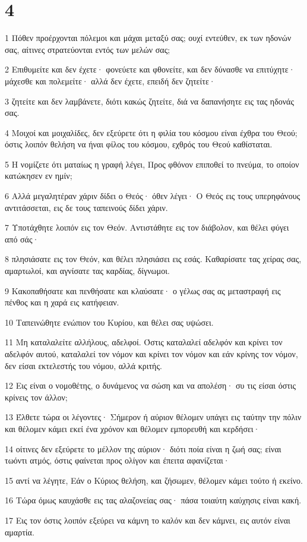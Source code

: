 \chapter{4}

\par 1 Πόθεν προέρχονται πόλεμοι και μάχαι μεταξύ σας; ουχί εντεύθεν, εκ των ηδονών σας, αίτινες στρατεύονται εντός των μελών σας;
\par 2 Επιθυμείτε και δεν έχετε· φονεύετε και φθονείτε, και δεν δύνασθε να επιτύχητε· μάχεσθε και πολεμείτε· αλλά δεν έχετε, επειδή δεν ζητείτε·
\par 3 ζητείτε και δεν λαμβάνετε, διότι κακώς ζητείτε, διά να δαπανήσητε εις τας ηδονάς σας.
\par 4 Μοιχοί και μοιχαλίδες, δεν εξεύρετε ότι η φιλία του κόσμου είναι έχθρα του Θεού; όστις λοιπόν θελήση να ήναι φίλος του κόσμου, εχθρός του Θεού καθίσταται.
\par 5 Η νομίζετε ότι ματαίως η γραφή λέγει, Προς φθόνον επιποθεί το πνεύμα, το οποίον κατώκησεν εν ημίν;
\par 6 Αλλά μεγαλητέραν χάριν δίδει ο Θεός· όθεν λέγει· Ο Θεός εις τους υπερηφάνους αντιτάσσεται, εις δε τους ταπεινούς δίδει χάριν.
\par 7 Υποτάχθητε λοιπόν εις τον Θεόν. Αντιστάθητε εις τον διάβολον, και θέλει φύγει από σάς·
\par 8 πλησιάσατε εις τον Θεόν, και θέλει πλησιάσει εις εσάς. Καθαρίσατε τας χείρας σας, αμαρτωλοί, και αγνίσατε τας καρδίας, δίγνωμοι.
\par 9 Κακοπαθήσατε και πενθήσατε και κλαύσατε· ο γέλως σας ας μεταστραφή εις πένθος και η χαρά εις κατήφειαν.
\par 10 Ταπεινώθητε ενώπιον του Κυρίου, και θέλει σας υψώσει.
\par 11 Μη καταλαλείτε αλλήλους, αδελφοί. Όστις καταλαλεί αδελφόν και κρίνει τον αδελφόν αυτού, καταλαλεί τον νόμον και κρίνει τον νόμον και εάν κρίνης τον νόμον, δεν είσαι εκτελεστής του νόμου, αλλά κριτής.
\par 12 Εις είναι ο νομοθέτης, ο δυνάμενος να σώση και να απολέση· συ τις είσαι όστις κρίνεις τον άλλον;
\par 13 Έλθετε τώρα οι λέγοντες· Σήμερον ή αύριον θέλομεν υπάγει εις ταύτην την πόλιν και θέλομεν κάμει εκεί ένα χρόνον και θέλομεν εμπορευθή και κερδήσει·
\par 14 οίτινες δεν εξεύρετε το μέλλον της αύριον· διότι ποία είναι η ζωή σας; είναι τωόντι ατμός, όστις φαίνεται προς ολίγον και έπειτα αφανίζεται·
\par 15 αντί να λέγητε, Εάν ο Κύριος θελήση, και ζήσωμεν, θέλομεν κάμει τούτο ή εκείνο.
\par 16 Τώρα όμως καυχάσθε εις τας αλαζονείας σας· πάσα τοιαύτη καύχησις είναι κακή.
\par 17 Εις τον όστις λοιπόν εξεύρει να κάμνη το καλόν και δεν κάμνει, εις αυτόν είναι αμαρτία.

